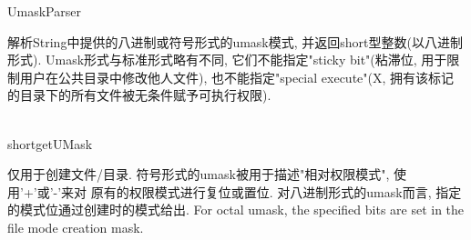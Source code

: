 \begin{XeClass}{UmaskParser}
   
 解析String中提供的八进制或符号形式的umask模式, 并返回short型整数(以八进制形式).
 Umask形式与标准形式略有不同, 它们不能指定"sticky bit"(粘滞位, 用于限制用户在公共目录中修改他人文件),
 也不能指定"special execute"(X, 拥有该标记的目录下的所有文件被无条件赋予可执行权限).

  \begin{XeMethod}{\XePublic\\ }{short}{getUMask}
       
 仅用于创建文件/目录. 符号形式的umask被用于描述"相对权限模式", 使用'+'或'-'来对
 原有的权限模式进行复位或置位.
 对八进制形式的umask而言, 指定的模式位通过创建时的模式给出.
 For octal umask, the specified bits are set in the file mode creation mask.

  \end{XeMethod}

\end{XeClass}
